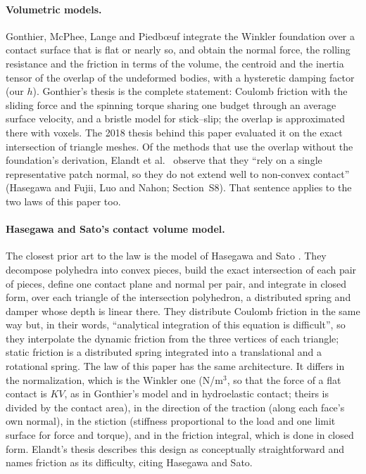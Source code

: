 \paragraph{Volumetric models.} Gonthier, McPhee, Lange and Piedb{\oe}uf \cite{Gonthier2005}
integrate the Winkler foundation over a contact surface that is flat or nearly so, and obtain
the normal force, the rolling resistance and the friction in terms of the volume, the centroid
and the inertia tensor of the overlap of the undeformed bodies, with a hysteretic damping factor
(our $h$). Gonthier's thesis \cite{Gonthier2007thesis} is the complete statement: Coulomb
friction with the sliding force and the spinning torque sharing one budget through an average
surface velocity, and a bristle model for stick--slip; the overlap is approximated there with
voxels. The
2018 thesis behind this paper \cite{Vilela2018} evaluated it on the exact intersection of
triangle meshes. Of the methods that use the overlap without the foundation's derivation,
Elandt et al.~\cite{Elandt2019} observe that they ``rely on a single representative patch
normal, so they do not extend well to non-convex contact'' (Hasegawa and Fujii, Luo and Nahon; Section~S8). That sentence applies to the two
laws of this paper too.

\paragraph{Hasegawa and Sato's contact volume model.} The closest prior art to the
 law is the model of Hasegawa and Sato \cite{Hasegawa2004}. They decompose
polyhedra into convex pieces, build the exact intersection of each pair of pieces, define one
contact plane and normal per pair, and integrate in closed form, over each triangle of the
intersection polyhedron, a distributed spring and damper whose depth is linear there. They
distribute Coulomb friction in the same way but, in their words, ``analytical integration of
this equation is difficult'', so they interpolate the dynamic friction from the three vertices
of each triangle; static friction is a distributed spring integrated into a translational and a
rotational spring. The  law of this paper has the same architecture. It
differs in the normalization, which is the Winkler one (N/m$^3$, so that the force of a flat
contact is $K V$, as in Gonthier's model and in hydroelastic contact; theirs is divided by the
contact area), in the direction of the traction (along each face's own normal), in the stiction
(stiffness proportional to the load and one limit surface for force and torque), and in the
friction integral, which is done in closed form. Elandt's thesis \cite{ElandtThesis2022}
describes this design as conceptually straightforward and names friction as its difficulty,
citing Hasegawa and Sato.

